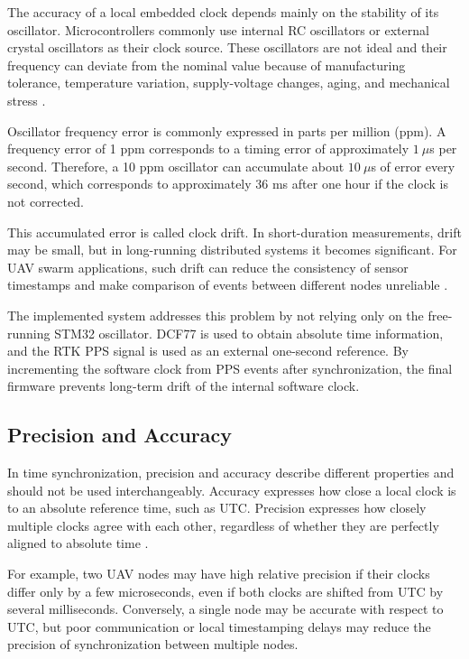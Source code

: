 The accuracy of a local embedded clock depends mainly on the stability of its oscillator. Microcontrollers commonly use internal RC oscillators or external crystal oscillators as their clock source. These oscillators are not ideal and their frequency can deviate from the nominal value because of manufacturing tolerance, temperature variation, supply-voltage changes, aging, and mechanical stress \cite{allan1966statistics,levine2012atomic}.

Oscillator frequency error is commonly expressed in parts per million (ppm). A frequency error of 1 ppm corresponds to a timing error of approximately $1~\mu$s per second. Therefore, a 10 ppm oscillator can accumulate about $10~\mu$s of error every second, which corresponds to approximately 36 ms after one hour if the clock is not corrected.

This accumulated error is called clock drift. In short-duration measurements, drift may be small, but in long-running distributed systems it becomes significant. For UAV swarm applications, such drift can reduce the consistency of sensor timestamps and make comparison of events between different nodes unreliable \cite{kopetz2011realtime}.

The implemented system addresses this problem by not relying only on the free-running STM32 oscillator. DCF77 is used to obtain absolute time information, and the RTK PPS signal is used as an external one-second reference. By incrementing the software clock from PPS events after synchronization, the final firmware prevents long-term drift of the internal software clock.

\subsection{Precision and Accuracy}

In time synchronization, precision and accuracy describe different properties and should not be used interchangeably. Accuracy expresses how close a local clock is to an absolute reference time, such as UTC. Precision expresses how closely multiple clocks agree with each other, regardless of whether they are perfectly aligned to absolute time \cite{kopetz2011realtime}.

For example, two UAV nodes may have high relative precision if their clocks differ only by a few microseconds, even if both clocks are shifted from UTC by several milliseconds. Conversely, a single node may be accurate with respect to UTC, but poor communication or local timestamping delays may reduce the precision of synchronization between multiple nodes.

